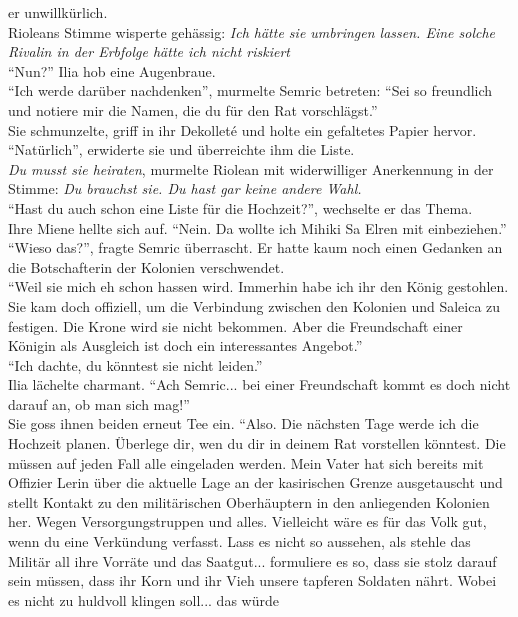er unwillkürlich.\\
Rioleans Stimme wisperte gehässig: \textit{Ich hätte sie umbringen lassen. Eine solche Rivalin in 
der Erbfolge hätte ich nicht riskiert}\\
``Nun?'' Ilia hob eine Augenbraue.\\
``Ich werde darüber nachdenken'', murmelte Semric betreten: ``Sei so freundlich und notiere mir die 
Namen, die du für den Rat vorschlägst.''\\
Sie schmunzelte, griff in ihr Dekolleté und holte ein gefaltetes Papier hervor. ``Natürlich'', 
erwiderte sie und überreichte ihm die Liste.\\
\textit{Du musst sie heiraten}, murmelte Riolean mit widerwilliger Anerkennung in der Stimme: 
\textit{Du brauchst sie. Du hast gar keine andere Wahl.}\\
``Hast du auch schon eine Liste für die Hochzeit?'', wechselte er das Thema.\\
Ihre Miene hellte sich auf. ``Nein. Da wollte ich Mihiki Sa Elren mit einbeziehen.''\\
``Wieso das?'', fragte Semric überrascht. Er hatte kaum noch einen Gedanken an die Botschafterin 
der Kolonien verschwendet.\\
``Weil sie mich eh schon hassen wird. Immerhin habe ich ihr den König gestohlen. Sie kam doch 
offiziell, um die Verbindung zwischen den Kolonien und Saleica zu festigen. Die Krone wird sie 
nicht bekommen. Aber die Freundschaft einer Königin als Ausgleich ist doch ein interessantes 
Angebot.''\\
``Ich dachte, du könntest sie nicht leiden.''\\
Ilia lächelte charmant. ``Ach Semric... bei einer Freundschaft kommt es doch nicht darauf an, ob 
man sich mag!''\\
Sie goss ihnen beiden erneut Tee ein. ``Also. Die nächsten Tage werde ich die Hochzeit 
planen. Überlege dir, wen du dir in deinem Rat vorstellen könntest. Die müssen auf jeden Fall alle 
eingeladen werden. Mein Vater hat sich bereits mit Offizier Lerin über die aktuelle Lage an der 
kasirischen Grenze ausgetauscht und stellt Kontakt zu den militärischen Oberhäuptern in den 
anliegenden Kolonien her. Wegen Versorgungstruppen und alles. Vielleicht wäre es für das Volk gut, 
wenn du eine Verkündung verfasst. Lass es nicht so aussehen, als stehle das Militär all ihre 
Vorräte und das Saatgut... formuliere es so, dass sie stolz darauf sein müssen, dass ihr Korn und 
ihr Vieh unsere tapferen Soldaten nährt. Wobei es nicht zu huldvoll klingen soll... das würde 
